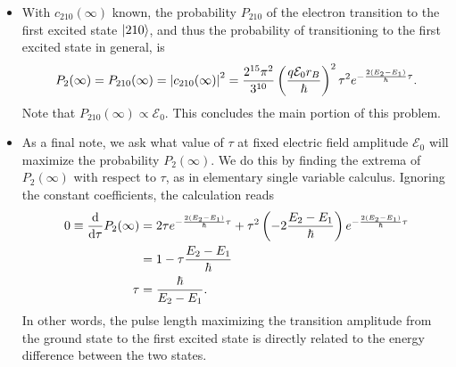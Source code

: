 \documentclass[11pt, a4paper]{article}
\newcommand{\E}{\mathcal{E}}  %
\begin{document}
\begin{itemize}
	\item With $ c_{210}(\infty) $ known, the probability $ P_{210} $ of the electron transition to the first excited state $ \ket{210} $, and thus the probability of transitioning to the first excited state in general, is
	\begin{equation*}
		P_{2}(\infty) = P_{210}(\infty) = \abs{c_{210}(\infty)}^{2} = \frac{2^{15}\pi^{2}}{3^{10}}\left(\frac{q\E_{0}r_{B}}{\hbar}\right)^{2} \tau^{2}e^{-\frac{2(E_{2} - E_{1})}{\hbar}\tau}.
	\end{equation*}
	Note that $ P_{210}(\infty)  \propto \E_{0} $. This concludes the main portion of this problem.
		
	\item As a final note, we ask what value of $ \tau $ at fixed electric field amplitude $ \E_{0} $ will maximize the probability $ P_{2}(\infty) $. We do this by finding the extrema of  $ P_{2}(\infty) $ with respect to $ \tau $, as in elementary single variable calculus. Ignoring the constant coefficients, the calculation reads
	\begin{align*}
		 0 \equiv \dv{\tau}P_{2}(\infty) & = 2 \tau e^{-\frac{2(E_{2} - E_{1})}{\hbar}\tau} + \tau^{2}\left(-2\frac{E_{2}- E_{1}}{\hbar}\right)e^{-\frac{2(E_{2} - E_{1})}{\hbar}\tau}\\
		& = 1 - \tau \frac{E_{2}-E_{1}}{\hbar}\\
		 \tau &= \frac{\hbar}{E_{2} - E_{1}}.
	\end{align*}
	In other words, the pulse length maximizing the transition amplitude from the ground state to the first excited state is directly related to the energy difference between the two states. 
	
\end{itemize}
\end{document}
